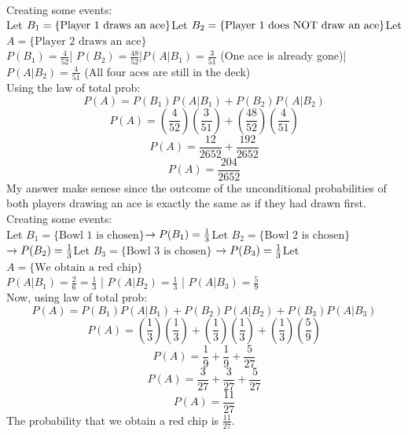 \documentclass[12pt]{article}
\begin{document}
\begin{enumerate}

\\Creating some events:\\
Let $B_1 = \{\text{Player 1 draws an ace}\}\\$Let $B_2 = \{\text{Player 1 does NOT draw an ace}\}\\$Let $A = \{\text{Player 2 draws an ace}\}$
\\$P(B_1) = \frac{4}{52}$\space |
$P(B_2) = \frac{48}{52}$\space |$P(A|B_1) = \frac{3}{51}$ (One ace is already gone)\space |\\
$P(A|B_2) = \frac{4}{51}$ (All four aces are still in the deck)
\\Using the law of total prob:
$$P(A) = P(B_1)P(A|B_1) + P(B_2)P(A|B_2)$$$$P(A) = \left(\frac{4}{52}\right)\left(\frac{3}{51}\right) + \left(\frac{48}{52}\right)\left(\frac{4}{51}\right)$$$$P(A) = \frac{12}{2652} + \frac{192}{2652}$$$$P(A) = \frac{204}{2652}$$ My answer make senese since the outcome of the unconditional probabilities of both players drawing an ace is exactly the same as if they had drawn first. 
\\Creating some events:\\
Let $B_1 = \{\text{Bowl 1 is chosen}\}$$\rightarrow P(B_1) = \frac{1}{3}\\$Let $B_2 = \{\text{Bowl 2 is chosen}\}$ $\rightarrow P(B_2) = \frac{1}{3}\\$Let $B_3 = \{\text{Bowl 3 is chosen}\}$ $\rightarrow P(B_3) = \frac{1}{3}\\$Let $A = \{\text{We obtain a red chip}\}$\\ $P(A|B_1) = \frac{2}{6} = \frac{1}{3}$ \space | $P(A|B_2) = \frac{1}{3}$ \space | $P(A|B_3) = \frac{5}{9}$\\Now, using law of total prob:$$P(A) = P(B_1)P(A|B_1) + P(B_2)P(A|B_2) + P(B_3)P(A|B_3)$$$$P(A) = \left(\frac{1}{3}\right)\left(\frac{1}{3}\right) + \left(\frac{1}{3}\right)\left(\frac{1}{3}\right) + \left(\frac{1}{3}\right)\left(\frac{5}{9}\right)$$$$P(A) = \frac{1}{9} + \frac{1}{9} + \frac{5}{27}$$$$P(A) = \frac{3}{27} + \frac{3}{27} + \frac{5}{27}$$$$P(A) = \frac{11}{27}$$The probability that we obtain a red chip is $\frac{11}{27}$.



\end{enumerate}
\end{document}
